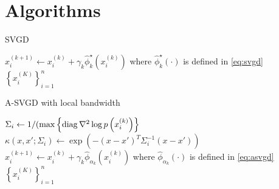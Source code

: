 





\section{Algorithms}

\begin{algorithm}[H] 
    \caption{SVGD} \label{alg:SVGD} 
\begin{algorithmic}
        \State $x_{i}^{(k+1)} \leftarrow x_{i}^{(k)}+ \gamma_k \hat{\phi}_k^{\star}\left(x_{i}^{(k)}\right)$ where $\hat{\phi}_k^{\star}(\cdot)$ is defined in \cref{eq:svgd}
        \EndFor
    \EndFor
    \State \Return $\left\{x_i^{(K)}  \right\}_{i = 1}^n$ 
   \EndProcedure 
\end{algorithmic}
\end{algorithm}

\begin{algorithm}[H] 
    \caption{A-SVGD with local bandwidth} \label{alg:ASVGD_bw} 
\begin{algorithmic}
        \State $\Sigma_i \gets 1/(\max \left\{\operatorname{diag} \nabla^2 \log p\left( x_{i}^{(k)}\right) \right\}$
        \State $\kappa(x, x'; \Sigma_i)\gets \exp(-(x - x')^T \Sigma_i^{-1}(x- x')  )$
        \State $x_{i}^{(k+1)} \leftarrow x_{i}^{(k)}+ \gamma_k \hat{\phi}_{\alpha_k}\left(x_{i}^{(k)}\right)$ where $\hat{\phi}_{\alpha_k}(\cdot)$ is defined in \cref{eq:asvgd}
        \EndFor
    \EndFor
    \State \Return $\left\{x_i^{(K)}  \right\}_{i = 1}^n$ 
   \EndProcedure 
\end{algorithmic}
\end{algorithm}





